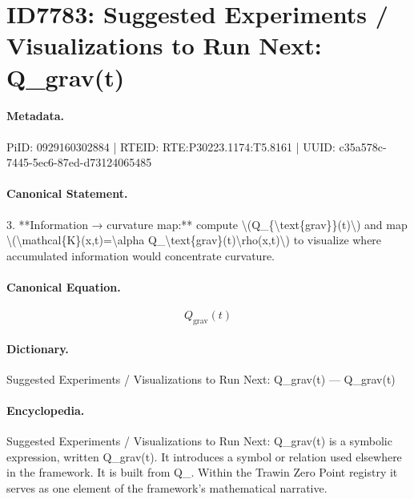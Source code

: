 \section*{ID7783: Suggested Experiments / Visualizations to Run Next: Q\_grav(t)}
\paragraph{Metadata.}
PiID: 0929160302884 | RTEID: RTE:P30223.1174:T5.8161 | UUID: c35a578c-7445-5ec6-87ed-d73124065485

\paragraph{Canonical Statement.}
3. **Information → curvature map:** compute \textbackslash{}(Q\_\{\textbackslash{}text\{grav\}\}(t)\textbackslash{}) and map \textbackslash{}(\textbackslash{}mathcal\{K\}(x,t)=\textbackslash{}alpha Q\_\textbackslash{}text\{grav\}(t)\textbackslash{}rho(x,t)\textbackslash{}) to visualize where accumulated information would concentrate curvature.

\paragraph{Canonical Equation.}
\[
Q_{\text{grav}}(t)
\]

\paragraph{Dictionary.}
Suggested Experiments / Visualizations to Run Next: Q\_grav(t) — Q\_grav(t)

\paragraph{Encyclopedia.}
Suggested Experiments / Visualizations to Run Next: Q\_grav(t) is a symbolic expression, written Q\_grav(t). It introduces a symbol or relation used elsewhere in the framework. It is built from Q\_. Within the Trawin Zero Point registry it serves as one element of the framework's mathematical narrative.
